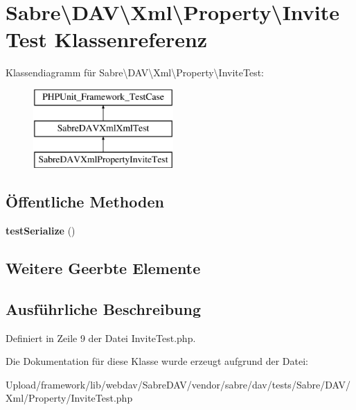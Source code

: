 \hypertarget{class_sabre_1_1_d_a_v_1_1_xml_1_1_property_1_1_invite_test}{}\section{Sabre\textbackslash{}D\+AV\textbackslash{}Xml\textbackslash{}Property\textbackslash{}Invite\+Test Klassenreferenz}
\label{class_sabre_1_1_d_a_v_1_1_xml_1_1_property_1_1_invite_test}
Klassendiagramm für Sabre\textbackslash{}D\+AV\textbackslash{}Xml\textbackslash{}Property\textbackslash{}Invite\+Test\+:\begin{figure}[H]
\begin{center}
\leavevmode
\includegraphics[height=3.000000cm]{class_sabre_1_1_d_a_v_1_1_xml_1_1_property_1_1_invite_test}
\end{center}
\end{figure}
\subsection*{Öffentliche Methoden}
\begin{DoxyCompactItemize}
\item 
\mbox{\label{class_sabre_1_1_d_a_v_1_1_xml_1_1_property_1_1_invite_test_a45748b775fd776c7fe29863802469dfc}} 
{\bfseries test\+Serialize} ()
\end{DoxyCompactItemize}
\subsection*{Weitere Geerbte Elemente}


\subsection{Ausführliche Beschreibung}


Definiert in Zeile 9 der Datei Invite\+Test.\+php.



Die Dokumentation für diese Klasse wurde erzeugt aufgrund der Datei\+:\begin{DoxyCompactItemize}
\item 
Upload/framework/lib/webdav/\+Sabre\+D\+A\+V/vendor/sabre/dav/tests/\+Sabre/\+D\+A\+V/\+Xml/\+Property/Invite\+Test.\+php\end{DoxyCompactItemize}
